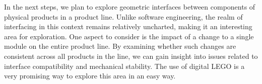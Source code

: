 \documentclass[sigconf,review]{acmart}
\begin{document}
In the next steps, we plan to explore geometric interfaces between components of physical products in a product line. Unlike software engineering, the realm of interfacing in this context remains relatively uncharted, making it an interesting area for exploration. 
One aspect to consider is the impact of a change to a single module on the entire product line. 
By examining whether such changes are consistent across all products in the line, we can gain insight into issues related to interface compatibility and mechanical stability. 
The use of digital LEGO is a very promising way to explore this area in an easy way.



\end{document}
